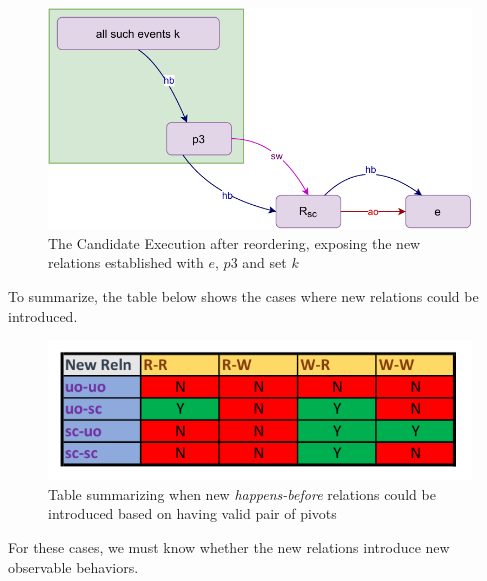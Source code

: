     \begin{figure}[H]
        \centering
        \includegraphics[scale=0.7]{5.InstructionReordering/4.ValidReorderingCandidate/ProofParts/Part2/part2(d).pdf}
        \caption{The Candidate Execution after reordering, exposing the new relations established with $e$, $p3$ and set $k$}
        \label{fig:my_label}
    \end{figure}

    To summarize, the table below shows the cases where new relations could be introduced. 
    \begin{figure}[H]
        \centering
        \includegraphics[scale=0.7]{5.InstructionReordering/4.ValidReorderingCandidate/ProofParts/Part2/part2_table.pdf}
        \caption{Table summarizing when new \textit{happens-before} relations could be introduced based on having valid pair of pivots }
        \label{fig:my_label}
    \end{figure}

    For these cases, we must know whether the new relations introduce new observable behaviors. 
